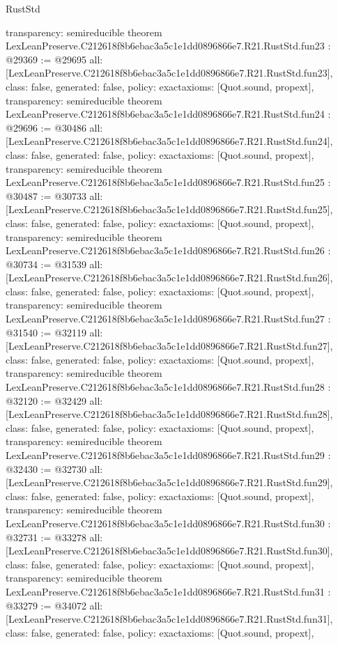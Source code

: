 \begin{lexlean}{RustStd}
\begin{coremodule}
{  transparency: semireducible
}
theorem LexLeanPreserve.C212618f8b6ebac3a5c1e1dd0896866e7.R21.RustStd.fun23 : @29369 := @29695 {
  all: [LexLeanPreserve.C212618f8b6ebac3a5c1e1dd0896866e7.R21.RustStd.fun23],
  class: false,
  generated: false,
  policy: exact{axioms: [Quot.sound, propext]},
  transparency: semireducible
}
theorem LexLeanPreserve.C212618f8b6ebac3a5c1e1dd0896866e7.R21.RustStd.fun24 : @29696 := @30486 {
  all: [LexLeanPreserve.C212618f8b6ebac3a5c1e1dd0896866e7.R21.RustStd.fun24],
  class: false,
  generated: false,
  policy: exact{axioms: [Quot.sound, propext]},
  transparency: semireducible
}
theorem LexLeanPreserve.C212618f8b6ebac3a5c1e1dd0896866e7.R21.RustStd.fun25 : @30487 := @30733 {
  all: [LexLeanPreserve.C212618f8b6ebac3a5c1e1dd0896866e7.R21.RustStd.fun25],
  class: false,
  generated: false,
  policy: exact{axioms: [Quot.sound, propext]},
  transparency: semireducible
}
theorem LexLeanPreserve.C212618f8b6ebac3a5c1e1dd0896866e7.R21.RustStd.fun26 : @30734 := @31539 {
  all: [LexLeanPreserve.C212618f8b6ebac3a5c1e1dd0896866e7.R21.RustStd.fun26],
  class: false,
  generated: false,
  policy: exact{axioms: [Quot.sound, propext]},
  transparency: semireducible
}
theorem LexLeanPreserve.C212618f8b6ebac3a5c1e1dd0896866e7.R21.RustStd.fun27 : @31540 := @32119 {
  all: [LexLeanPreserve.C212618f8b6ebac3a5c1e1dd0896866e7.R21.RustStd.fun27],
  class: false,
  generated: false,
  policy: exact{axioms: [Quot.sound, propext]},
  transparency: semireducible
}
theorem LexLeanPreserve.C212618f8b6ebac3a5c1e1dd0896866e7.R21.RustStd.fun28 : @32120 := @32429 {
  all: [LexLeanPreserve.C212618f8b6ebac3a5c1e1dd0896866e7.R21.RustStd.fun28],
  class: false,
  generated: false,
  policy: exact{axioms: [Quot.sound, propext]},
  transparency: semireducible
}
theorem LexLeanPreserve.C212618f8b6ebac3a5c1e1dd0896866e7.R21.RustStd.fun29 : @32430 := @32730 {
  all: [LexLeanPreserve.C212618f8b6ebac3a5c1e1dd0896866e7.R21.RustStd.fun29],
  class: false,
  generated: false,
  policy: exact{axioms: [Quot.sound, propext]},
  transparency: semireducible
}
theorem LexLeanPreserve.C212618f8b6ebac3a5c1e1dd0896866e7.R21.RustStd.fun30 : @32731 := @33278 {
  all: [LexLeanPreserve.C212618f8b6ebac3a5c1e1dd0896866e7.R21.RustStd.fun30],
  class: false,
  generated: false,
  policy: exact{axioms: [Quot.sound, propext]},
  transparency: semireducible
}
theorem LexLeanPreserve.C212618f8b6ebac3a5c1e1dd0896866e7.R21.RustStd.fun31 : @33279 := @34072 {
  all: [LexLeanPreserve.C212618f8b6ebac3a5c1e1dd0896866e7.R21.RustStd.fun31],
  class: false,
  generated: false,
  policy: exact{axioms: [Quot.sound, propext]},
}
\end{coremodule}
\end{lexlean}

